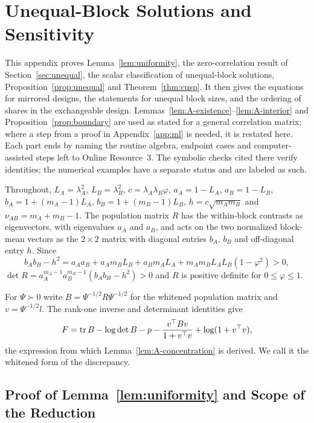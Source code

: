 \section{Unequal-Block Solutions and Sensitivity}
\label{app:unequal}

This appendix proves Lemma~\ref{lem:uniformity}, the zero-correlation result of Section~\ref{sec:unequal}, the scalar classification of unequal-block solutions, Proposition~\ref{prop:unequal} and Theorem~\ref{thm:cusp}. It then gives the equations for mirrored designs, the statements for unequal block sizes, and the ordering of shares in the exchangeable design. Lemmas~\ref{lem:A-existence}--\ref{lem:A-interior} and Proposition~\ref{prop:boundary} are used as stated for a general correlation matrix; where a step from a proof in Appendix~\ref{app:ml} is needed, it is restated here. Each part ends by naming the routine algebra, endpoint cases and computer-assisted steps left to Online Resource~3. The symbolic checks cited there verify identities; the numerical examples have a separate status and are labeled as such.

Throughout, $L_A=\lambda_A^2$, $L_B=\lambda_B^2$, $c=\lambda_A\lambda_B\varphi$, $a_A=1-L_A$, $a_B=1-L_B$, $b_A=1+(m_A-1)L_A$, $b_B=1+(m_B-1)L_B$, $h=c\sqrt{m_Am_B}$ and $\nu_{AB}=m_A+m_B-1$. The population matrix $R$ has the within-block contrasts as eigenvectors, with eigenvalues $a_A$ and $a_B$, and acts on the two normalized block-mean vectors as the $2\times2$ matrix with diagonal entries $b_A$, $b_B$ and off-diagonal entry $h$. Since
\[
b_Ab_B-h^2=a_Aa_B+a_Am_BL_B+a_Bm_AL_A+m_Am_BL_AL_B(1-\varphi^2)>0,
\]
$\det R=a_A^{m_A-1}a_B^{m_B-1}(b_Ab_B-h^2)>0$ and $R$ is positive definite for $0\le\varphi\le1$.

For $\Psi\succ0$ write $B=\Psi^{-1/2}R\Psi^{-1/2}$ for the whitened population matrix and $v=\Psi^{-1/2}l$. The rank-one inverse and determinant identities give
\[
F=\operatorname{tr} B-\log\det B-p-\frac{v^{\top}Bv}{1+v^{\top}v}+\log(1+v^{\top}v),
\]
the expression from which Lemma~\ref{lem:A-concentration} is derived. We call it the whitened form of the discrepancy.

\subsection{Proof of Lemma~\ref{lem:uniformity} and Scope of the Reduction}
\label{app:unequal-reduction}

